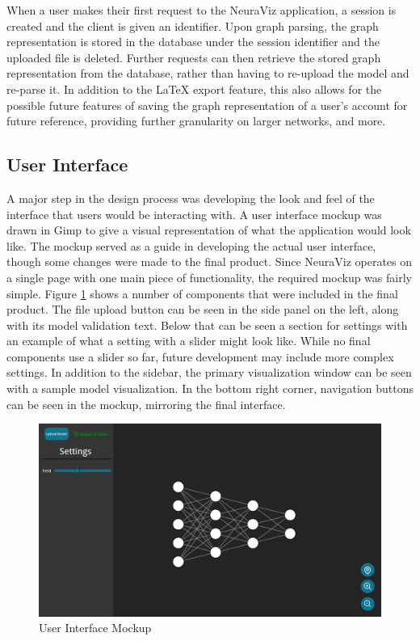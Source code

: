 When a user makes their first request to the NeuraViz application, a session is created and the client is given an identifier. Upon graph parsing, the graph representation is stored in the database under the session identifier and the uploaded file is deleted. Further requests can then retrieve the stored graph representation from the database, rather than having to re-upload the model and re-parse it. In addition to the \LaTeX{} export feature, this also allows for the possible future features of saving the graph representation of a user's account for future reference, providing further granularity on larger networks, and more.

\subsection{User Interface}
A major step in the design process was developing the look and feel of the interface that users would be interacting with. A user interface mockup was drawn in Gimp to give a visual representation of what the application would look like. The mockup served as a guide in developing the actual user interface, though some changes were made to the final product. Since NeuraViz operates on a single page with one main piece of functionality, the required mockup was fairly simple. Figure \ref{fig:ui_mockup} shows a number of components that were included in the final product. The file upload button can be seen in the side panel on the left, along with its model validation text. Below that can be seen a section for settings with an example of what a setting with a slider might look like. While no final components use a slider so far, future development may include more complex settings. In addition to the sidebar, the primary visualization window can be seen with a sample model visualization. In the bottom right corner, navigation buttons can be seen in the mockup, mirroring the final interface.

\begin{figure}[ht]
    \centering
    \includegraphics[width=1\textwidth]{../docs/mockups/Main.png}
    \caption{User Interface Mockup}
    \label{fig:ui_mockup}
\end{figure}

